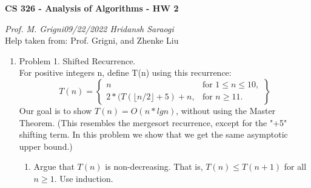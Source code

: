 \documentclass[11pt]{article}
\begin{document}
\begin{center}
    \textbf{CS 326 - Analysis of Algorithms - HW 2}\\
\end{center}


\begin{flushleft}
    \textit{Prof. M. Grigni\hfill09/22/2022 \hfill Hridansh Saraogi} \\
    \vspace{0.15cm}
    \small {Help taken from: Prof. Grigni, and Zhenke Liu}
\end{flushleft}


\begin{enumerate}

\item Problem 1. Shifted Recurrence. \\
For positive integers n, define T(n) using this recurrence:
\begin{equation}
T(n) = 
\left\{
    \begin{array}{lr}
        n & \text{for }  1 \leq n \leq 10,\\
        2*(T( \lfloor n/2 \rfloor + 5)+n, & \text{for } n\geq 11.
    \end{array}
\right\}
\end{equation}
Our goal is to show $T(n) = O(n*lg n)$, without using the Master Theorem. (This resembles the mergesort recurrence, except for the "+5" shifting term. In this problem we show that we get the same asymptotic upper bound.)

    \begin{enumerate}
        \item Argue that $T(n)$ is non-decreasing. That is, $T(n) \leq T(n+1)$ for all $n \geq 1$. Use induction.
        

\end{enumerate}
\end{enumerate}
\end{document}
